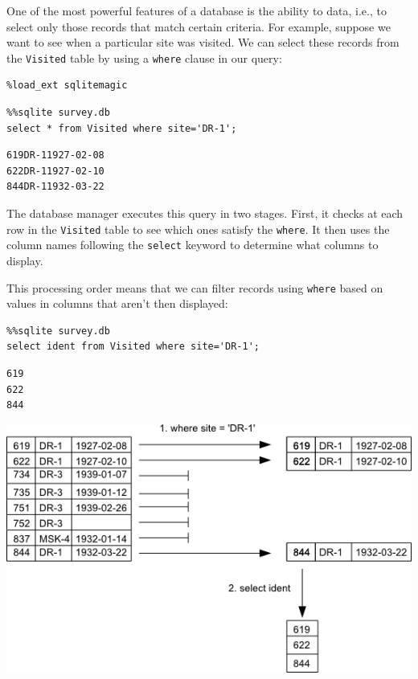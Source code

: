 \documentclass{book}
\begin{document}
One of the most powerful features of a database is the ability to
 data, i.e., to select only those records
that match certain criteria. For example, suppose we want to see when a
particular site was visited. We can select these records from the
\texttt{Visited} table by using a \texttt{where} clause in our query:

\begin{verbatim}
%load_ext sqlitemagic
\end{verbatim}

\begin{verbatim}
%%sqlite survey.db
select * from Visited where site='DR-1';
\end{verbatim}

\begin{verbatim}
619DR-11927-02-08
622DR-11927-02-10
844DR-11932-03-22
\end{verbatim}

The database manager executes this query in two stages. First, it checks
at each row in the \texttt{Visited} table to see which ones satisfy the
\texttt{where}. It then uses the column names following the
\texttt{select} keyword to determine what columns to display.

This processing order means that we can filter records using
\texttt{where} based on values in columns that aren't then displayed:

\begin{verbatim}
%%sqlite survey.db
select ident from Visited where site='DR-1';
\end{verbatim}

\begin{verbatim}
619
622
844
\end{verbatim}

\includegraphics{novice/sql/img/sql-filter.png}
\end{document}
